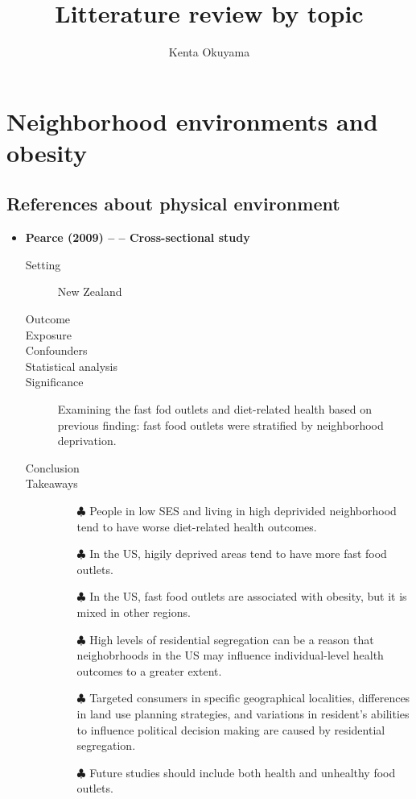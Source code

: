 \documentclass{article}
\title{Litterature review by topic}
\author{Kenta Okuyama}
\begin{document}
\maketitle
\tableofcontents
\newpage
{}


\section{Neighborhood environments and obesity}
\subsection{References about physical environment}

\begin{itemize}
		\item {\bf Pearce (2009) -- -- Cross-sectional study}
				\begin{description}
						\item[Setting] New Zealand
						\item[Outcome]
						\item[Exposure]
						\item[Confounders]
						\item[Statistical analysis]
						\item[Significance] Examining the fast fod outlets and diet-related health based on previous finding: fast food outlets were stratified by neighborhood deprivation.
						\item[Conclusion]
    	         		\item[Takeaways] \mbox{}\par
    			        	\begin{itemize}
									\item[$\clubsuit$] People in low SES and living in high deprivided neighborhood tend to have worse diet-related health outcomes.
									\item[$\clubsuit$] In the US, higily deprived areas tend to have more fast food outlets.
									\item[$\clubsuit$] In the US, fast food outlets are associated with obesity, but it is mixed in other regions.
									\item[$\clubsuit$] High levels of residential segregation can be a reason that neighobrhoods in the US may influence individual-level health outcomes to a greater extent.  
									\item[$\clubsuit$] Targeted consumers in specific geographical localities, differences in land use planning strategies, and variations in resident's abilities to influence political decision making are caused by residential segregation.
									\item[$\clubsuit$] Future studies should include both health and unhealthy food outlets. 
							\end{itemize}
			    \end{description}


\end{itemize}
\end{document}
